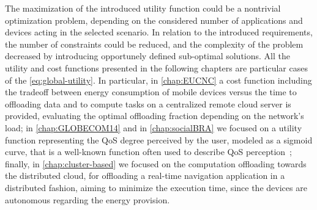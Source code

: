 \documentclass[twoside,openright]{report}
\begin{document}
The maximization of the introduced utility function could be a nontrivial optimization problem, depending on the considered number of applications and devices acting in the selected scenario. 
In relation to the introduced requirements, the number of constraints could be reduced, and the complexity of the problem decreased by introducing opportunely defined sub-optimal solutions. 
All the utility and cost functions presented in the following chapters are particular cases of the \autoref{eq:global-utility}. 
In particular, in \autoref{chap:EUCNC}  a cost function including the tradeoff between energy consumption of mobile devices versus the time to offloading data and to compute tasks on a centralized remote cloud server is provided, evaluating the optimal offloading fraction depending on the network’s load; in \autoref{chap:GLOBECOM14} and in \autoref{chap:socialBRA} we focused on a utility function representing the \gls{QoS} degree perceived by the user, modeled as a sigmoid curve, that is a well-known function often used to describe \gls{QoS} perception~\cite{Badia}; finally, in \autoref{chap:cluster-based} we focused on the computation offloading towards the distributed cloud, for offloading a real-time navigation application in a distributed fashion, aiming to minimize the execution time, since the devices are autonomous regarding the energy provision. 
%
%
\end{document}
